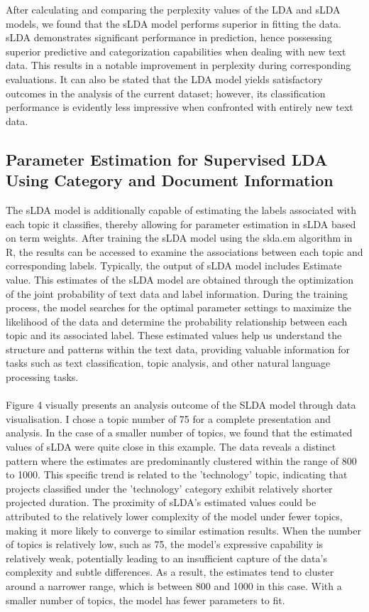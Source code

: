 \documentclass[12pt,twoside]{article}
\begin{document}
After calculating and comparing the perplexity values of the LDA and sLDA models, we found that the sLDA model performs superior in fitting the data. sLDA demonstrates significant performance in prediction, hence possessing superior predictive and categorization capabilities when dealing with new text data. This results in a notable improvement in perplexity during corresponding evaluations. It can also be stated that the LDA model yields satisfactory outcomes in the analysis of the current dataset; however, its classification performance is evidently less impressive when confronted with entirely new text data.

\subsection{Parameter Estimation for Supervised LDA Using Category and Document Information}
The sLDA model is additionally capable of estimating the labels associated with each topic it classifies, thereby allowing for parameter estimation in sLDA based on term weights. After training the sLDA model using the slda.em algorithm in R, the results can be accessed to examine the associations between each topic and corresponding labels. Typically,
the output of sLDA model includes Estimate value. This estimates of the sLDA model are obtained through the optimization of the joint probability of text data and label information. During the training process, the model searches for the optimal parameter settings to maximize the likelihood of the data and determine the probability relationship between each topic and its associated label. These estimated values help us understand the structure and patterns within the text data, providing valuable information for tasks such as text classification, topic analysis, and other natural language processing tasks.\\\\


Figure 4 visually presents an analysis outcome of the SLDA model through data visualisation. I chose a topic number of 75 for a complete presentation and analysis. In the case of a smaller number of topics, we found that the estimated values of sLDA were quite close in this example. The data reveals a distinct pattern where the estimates are predominantly clustered within the range of 800 to 1000. This specific trend is related to the 'technology' topic, indicating that projects classified under the 'technology' category exhibit relatively shorter projected duration. The proximity of sLDA's estimated values could be attributed to the relatively lower complexity of the model under fewer topics, making it more likely to converge to similar estimation results. When the number of topics is relatively low, such as 75, the model's expressive capability is relatively weak, potentially leading to an insufficient capture of the data's complexity and subtle differences. As a result, the estimates tend to cluster around a narrower range, which is between 800 and 1000 in this case. With a smaller number of topics, the model has fewer parameters to fit.\\\\
\end{document}
